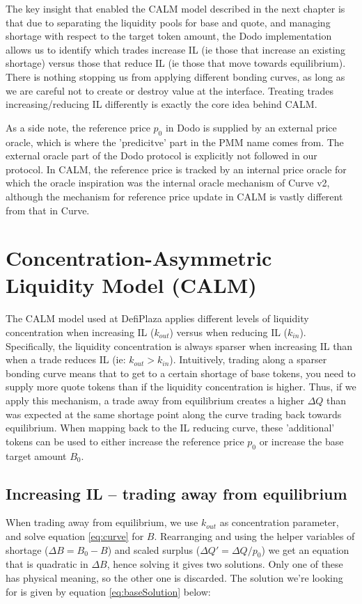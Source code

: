 \documentclass [10pt, twoside] {article}
\newcounter {note}
\begin{document}
The key insight that enabled the CALM model described in the next chapter is that due to separating the liquidity pools for base and quote, and managing shortage with respect to the target token amount, the Dodo implementation allows us to identify which trades increase IL (ie those that increase an existing shortage) versus those that reduce IL (ie those that move towards equilibrium). There is nothing stopping us from applying different bonding curves, as long as we are careful not to create or destroy value at the interface. Treating trades increasing/reducing IL differently is exactly the core idea behind CALM.

As a side note, the reference price $p_0$ in Dodo is supplied by an external price oracle, which is where the 'predicitve' part in the PMM name comes from. The external oracle part of the Dodo protocol is explicitly not followed in our protocol. In CALM, the reference price is tracked by an internal price oracle for which the oracle inspiration was the internal oracle mechanism of Curve v2, although the mechanism for reference price update in CALM is vastly different from that in Curve. 

\section{Concentration-Asymmetric Liquidity Model (CALM)}
The CALM model used at DefiPlaza applies different levels of liquidity concentration when increasing IL ($k_{out}$) versus when reducing IL ($k_{in}$). Specifically, the liquidity concentration is always sparser when increasing IL than when a trade reduces IL (ie: $k_{out} > k_{in}$). Intuitively, trading along a sparser bonding curve means that to get to a certain shortage of base tokens, you need to supply more quote tokens than if the liquidity concentration is higher. Thus, if we apply this mechanism, a trade away from equilibrium creates a higher $\Delta Q$ than was expected at the same shortage point along the curve trading back towards equilibrium. When mapping back to the IL reducing curve, these 'additional' tokens can be used to either increase the reference price $p_0$ or increase the base target amount $B_0$.

\subsection{Increasing IL -- trading away from equilibrium}
When trading away from equilibrium, we use $k_{out}$ as concentration parameter, and solve equation \ref{eq:curve} for $B$. Rearranging and using the helper variables of shortage ($\Delta B = B_0 - B$) and scaled surplus ($\Delta Q' = \Delta Q / p_0$) we get an equation that is quadratic in $\Delta B$, hence solving it gives two solutions. Only one of these has physical meaning, so the other one is discarded. The solution we're looking for is given by equation \ref{eq:baseSolution} below:
\end{document}
